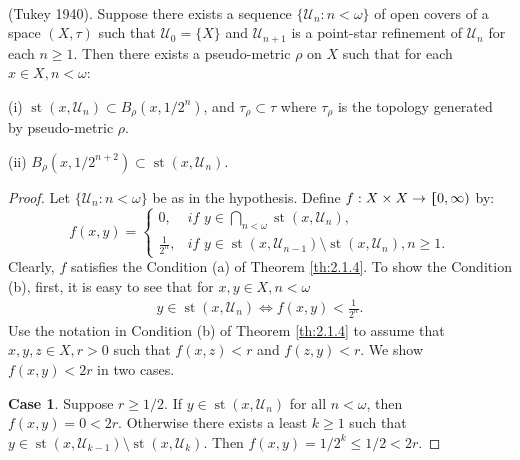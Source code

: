 \documentclass[main.tex]{subfiles}
\begin{document}
{\theorem{}\label{th:2.1.5}
\textup{(\hstretch{1.8}{[}Tukey 1940\hstretch{1.8}{]}\textsuperscript{\cite{Tukey}})}. 
Suppose there exists 
a sequence $\{\mathscr{U}_n: n<\omega\}$ of open covers of a space $(X, \tau)$ 
such that $\mathscr{U}_0 = \{X\}$ and 
$\mathscr{U}_{n+1}$ is a point-star refinement of $\mathscr{U}_n$ for each $n \ge 1$. 
Then there exists a pseudo-metric $\rho$ on $X$ such that for each $x \in X, n < \omega:$
	
\textup{(i)}  $\operatorname{st}(x, \mathscr{U}_n) \subset B_\rho(x, 1/{2^n})$,
and $\tau_\rho \subset \tau$ where  $\tau_\rho$ is the topology generated by pseudo-metric $\rho$.
	
\textup{(ii)} $B_\rho(x, 1/{2^{n+2}}) \subset \operatorname{st}(x, \mathscr{U}_n)$.
}

\begin{proof}
Let $\{\mathscr{U}_n: n<\omega\}$ be as in the hypothesis. 
	Define $f: X \times X \to \hstretch{1.8}{[}0, \infty)$ by:
$$f(x, y) =  \begin{cases} 
		0, & \textit{if } y \in \bigcap_{n < \omega} \operatorname{st}(x, \mathscr{U}_n), \\  
		\frac{1}{2^n}, &
		\textit{if } y \in \operatorname{st}(x, \mathscr{U}_{n-1}) 
		\setminus \operatorname{st}(x, \mathscr{U}_{n}), n \ge 1.  
	\end{cases}$$
Clearly, $f$ satisfies the Condition (a) of Theorem \ref{th:2.1.4}.
To show the Condition (b), first, it is easy to see that
	for $x, y \in X, n < \omega$
	\begin{gather}
		y \in \operatorname{st}(x, \mathscr{U}_n) \iff f(x, y) < \frac{1}{2^n}. \label{eq:2.1.5.1}
	\end{gather}
	Use the notation in Condition (b) of Theorem \ref{th:2.1.4} to
	assume that $x, y, z \in X, r > 0$ such that $f(x, z) < r$ and $f(z, y) < r$.
	We show $f(x, y) < 2r$ in
	two cases.
	
\textbf{Case 1}. Suppose $r \ge 1/2$. If $y \in \operatorname{st}(x, \mathscr{U}_n)$ 
	for all $n < \omega$, then $f(x, y) = 0 < 2r$. Otherwise there exists a least $k \ge 1$
	such that $y \in \operatorname{st}(x, \mathscr{U}_{k-1}) \setminus \operatorname{st}(x, \mathscr{U}_k)$. Then $f(x, y) = 1/{2^k} \le 1/2 < 2r$.
	

\end{proof}
\end{document}
